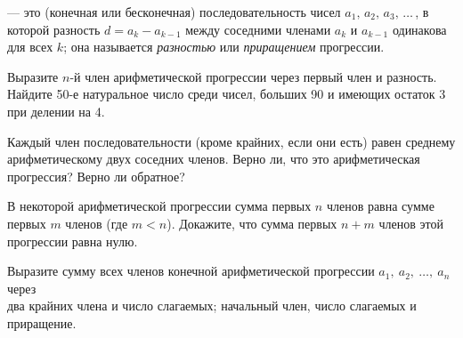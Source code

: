 \documentclass[a4paper,11pt]{article}
\begin{document}



  --- это (конечная или бесконечная)
последовательность чисел $a_1,\,a_2,\,a_3,\,\ldots\,$,
в которой разность $d=a_k-a_{k-1}$ между соседними членами $a_k$ и $a_{k-1}$
одинакова для всех $k$; она называется {\it разностью\/} или {\it
приращением\/} прогрессии.

 Выразите $n$-й член арифметической прогрессии через
первый член и разность.\\
 Найдите 50-е натуральное число среди чисел, больших 90 и имеющих
остаток 3 при делении на 4.

 Каждый член последовательности (кроме крайних, если
они есть) равен среднему арифметическому двух соседних членов.
Верно ли, что это %
арифметическая прогрессия?
 Верно ли обратное?

 В некоторой арифметической прогрессии сумма первых
$n$ членов равна сумме первых $m$ членов (где $m<n$).
Докажите, что сумма первых $n+m$ членов этой прогрессии равна нулю.






Выразите сумму всех членов конечной арифметической
прогрессии $a_1,\ \!a_2,\ \!\ldots,\ \!a_n$
через\\
 два крайних члена и число слагаемых;
 начальный член, число слагаемых и приращение.
\end{document}
